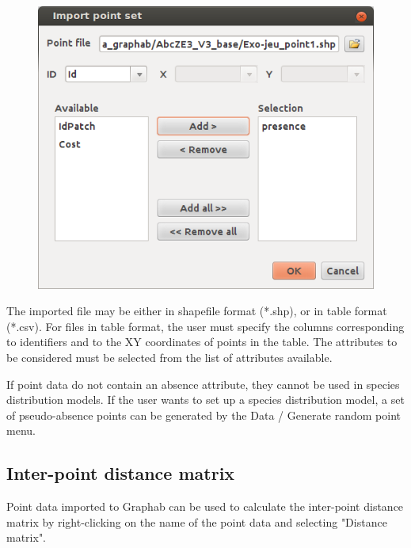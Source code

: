 \documentclass{article}
\begin{document}
\begin{figure}[H]
	\includegraphics[scale=0.5]{img/manual-en_img12.png}
\end{figure}

The imported file may be either in shapefile format (*.shp), or in table format (*.csv). For files in table format, the user must specify the columns corresponding to identifiers and to the XY coordinates of points in the table. The attributes to be considered must be selected from the list of attributes available.

If point data do not contain an absence attribute, they cannot be used in species distribution models. If the user wants to set up a species distribution model, a set of pseudo-absence points can be generated by the Data / Generate random point menu.

\subsection{Inter-point distance matrix}

Point data imported to Graphab can be used to calculate the inter-point distance matrix by right-clicking on the name of the point data and selecting "Distance matrix".
\end{document}
